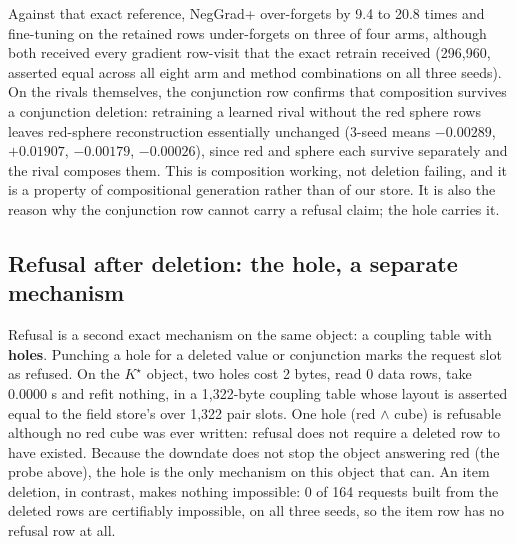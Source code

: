 \documentclass{article} %
\newcommand{\Kstar}{\ensuremath{K^{\star}}}
\begin{document}
\noindent Against that exact reference, NegGrad+ over-forgets by 9.4 to 20.8 times and
fine-tuning on the retained rows under-forgets on three of four arms, although both received
every gradient row-visit that the exact retrain received (296,960, asserted equal across all
eight arm and method combinations on all three seeds). %
On the rivals themselves, the conjunction row confirms that composition survives a conjunction
deletion: retraining a learned rival without the red sphere rows leaves red-sphere
reconstruction essentially unchanged (3-seed means $-0.00289$, $+0.01907$, $-0.00179$,
$-0.00026$), since red and sphere each survive separately and the rival composes them.
This is composition working, not deletion failing, and it is a property of compositional
generation rather than of our store. It is also the reason why the conjunction row cannot carry a
refusal claim; the hole carries it.

\subsection{Refusal after deletion: the hole, a separate mechanism}
\label{sec:hole}

Refusal is a second exact mechanism on the same object: a coupling table with \textbf{holes}.
Punching a hole for a deleted value or conjunction marks the request slot as refused. On the
$\Kstar$ object, two holes cost 2 bytes, read 0 data rows, take 0.0000 s and refit nothing, in
a 1,322-byte coupling table whose layout is asserted equal to the field store's over 1,322 pair
slots. %
One hole (red $\wedge$ cube) is refusable although no red cube was ever written: refusal does
not require a deleted row to have existed. %
Because the downdate does not stop the object answering red (the probe above), the hole is the
only mechanism on this object that can. An item deletion, in contrast, makes nothing impossible:
0 of 164 requests built from the deleted rows are certifiably impossible, on all three seeds, so
the item row has no refusal row at all. %
\end{document}
